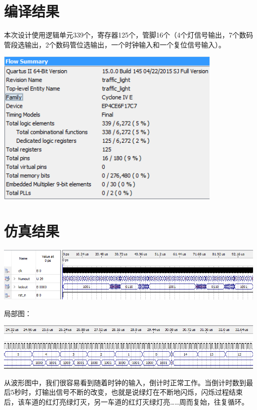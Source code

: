 \documentclass[12pt,a4paper]{article}
\begin{document}
\section{编译结果}
本次设计使用逻辑单元339个，寄存器125个，管脚16个（4个灯信号输出，7个数码管段选输出，2个数码管位选输出，一个时钟输入和一个复位信号输入）。
\begin{center}
	\includegraphics[width=11cm]{pic/result}
\end{center}

\section{仿真结果}
\begin{center}
	\includegraphics[width=16cm]{pic/wave}
\end{center}
局部图：
\begin{center}
\includegraphics[width=16cm]{pic/wave2}
\end{center}

从波形图中，我们很容易看到随着时钟的输入，倒计时正常工作。当倒计时数到最后5秒时，灯输出信号不断的改变，也就是说绿灯在不断地闪烁，闪烁过程结束后，该车道的红灯亮绿灯灭，另一车道的红灯灭绿灯亮……周而复始，往复循环。
\end{document}
